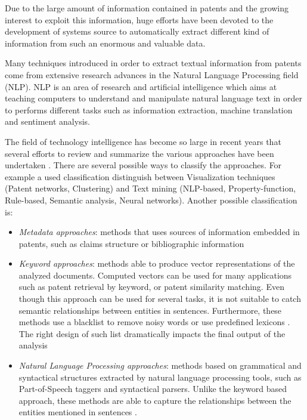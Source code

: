 \documentclass[b5paper,]{book}
\theoremstyle{definition}
\theoremstyle{definition}
\theoremstyle{definition}
\theoremstyle{remark}
\begin{document}
Due to the large amount of information contained in patents and the
growing interest to exploit this information, huge efforts have been
devoted to the development of systems source to automatically extract
different kind of information from such an enormous and valuable data.

Many techniques introduced in order to extract textual information from
patents come from extensive research advances in the Natural Language
Processing field (NLP). NLP is an area of research and artificial
intelligence which aims at teaching computers to understand and
manipulate natural language text in order to performs different tasks
such as information extraction, machine translation and sentiment
analysis.

The field of technology intelligence has become so large in recent years
that several efforts to review and summarize the various approaches have
been undertaken \citep{abbas2014literature}. There are several possible
ways to classify the approaches. For example a used classification
distinguish between Visualization techniques (Patent networks,
Clustering) and Text mining (NLP-based, Property-function, Rule-based,
Semantic analysis, Neural networks). Another possible classification is:

\begin{itemize}
\item
  \emph{Metadata approaches}: methods that uses sources of information
  embedded in patents, such as claims structure or bibliographic
  information
\item
  \emph{Keyword approaches}: methods able to produce vector
  representations of the analyzed documents. Computed vectors can be
  used for many applications such as patent retrieval by keyword, or
  patent similarity matching. Even though this approach can be used for
  several tasks, it is not suitable to catch semantic relationships
  between entities in sentences. Furthermore, these methods use a
  blacklist to remove noisy words \citep{blanchard2007understanding} or
  use predefined lexicons \citep{chiarello2017product}. The right design
  of such list dramatically impacts the final output of the analysis
  \citep{Lee2009, Lee2015, Montecchi2013}
\item
  \emph{Natural Language Processing approaches}: methods based on
  grammatical and syntactical structures extracted by natural language
  processing tools, such as Part-of-Speech taggers and syntactical
  parsers. Unlike the keyword based approach, these methods are able to
  capture the relationships between the entities mentioned in sentences
  \citep{Park20131, Park2011a, Park20133}.
\end{itemize}
\end{document}

